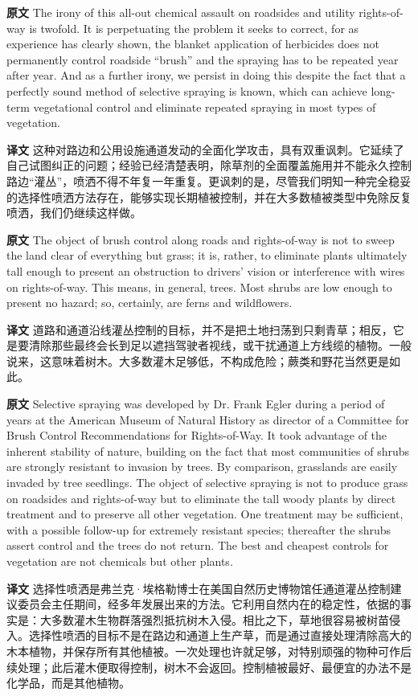 \documentclass[UTF8,zihao=-4]{ctexart}
\begin{document}
\noindent\textbf{原文} The irony of this all-out chemical assault on roadsides and utility rights-of-way is twofold. It is perpetuating the problem it seeks to correct, for as experience has clearly shown, the blanket application of herbicides does not permanently control roadside ``brush'' and the spraying has to be repeated year after year. And as a further irony, we persist in doing this despite the fact that a perfectly sound method of selective spraying is known, which can achieve long-term vegetational control and eliminate repeated spraying in most types of vegetation.
\par
\noindent\textbf{译文} 这种对路边和公用设施通道发动的全面化学攻击，具有双重讽刺。它延续了自己试图纠正的问题；经验已经清楚表明，除草剂的全面覆盖施用并不能永久控制路边“灌丛”，喷洒不得不年复一年重复。更讽刺的是，尽管我们明知一种完全稳妥的选择性喷洒方法存在，能够实现长期植被控制，并在大多数植被类型中免除反复喷洒，我们仍继续这样做。
\par\medskip

\noindent\textbf{原文} The object of brush control along roads and rights-of-way is not to sweep the land clear of everything but grass; it is, rather, to eliminate plants ultimately tall enough to present an obstruction to drivers' vision or interference with wires on rights-of-way. This means, in general, trees. Most shrubs are low enough to present no hazard; so, certainly, are ferns and wildflowers.
\par
\noindent\textbf{译文} 道路和通道沿线灌丛控制的目标，并不是把土地扫荡到只剩青草；相反，它是要清除那些最终会长到足以遮挡驾驶者视线，或干扰通道上方线缆的植物。一般说来，这意味着树木。大多数灌木足够低，不构成危险；蕨类和野花当然更是如此。
\par\medskip

\noindent\textbf{原文} Selective spraying was developed by Dr. Frank Egler during a period of years at the American Museum of Natural History as director of a Committee for Brush Control Recommendations for Rights-of-Way. It took advantage of the inherent stability of nature, building on the fact that most communities of shrubs are strongly resistant to invasion by trees. By comparison, grasslands are easily invaded by tree seedlings. The object of selective spraying is not to produce grass on roadsides and rights-of-way but to eliminate the tall woody plants by direct treatment and to preserve all other vegetation. One treatment may be sufficient, with a possible follow-up for extremely resistant species; thereafter the shrubs assert control and the trees do not return. The best and cheapest controls for vegetation are not chemicals but other plants.
\par
\noindent\textbf{译文} 选择性喷洒是弗兰克·埃格勒博士在美国自然历史博物馆任通道灌丛控制建议委员会主任期间，经多年发展出来的方法。它利用自然内在的稳定性，依据的事实是：大多数灌木生物群落强烈抵抗树木入侵。相比之下，草地很容易被树苗侵入。选择性喷洒的目标不是在路边和通道上生产草，而是通过直接处理清除高大的木本植物，并保存所有其他植被。一次处理也许就足够，对特别顽强的物种可作后续处理；此后灌木便取得控制，树木不会返回。控制植被最好、最便宜的办法不是化学品，而是其他植物。
\par\medskip
\end{document}
